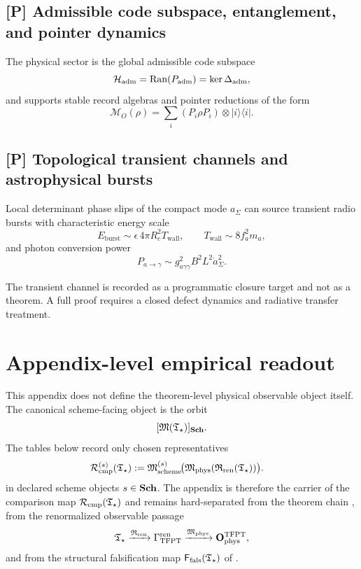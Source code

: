 \subsection{[P] Admissible code subspace, entanglement, and pointer dynamics}

\begin{conjecture}
\label{prop:global_admissible_code_subspace}
The physical sector is the global admissible code subspace
\[
\mathcal H_{\mathrm{adm}}=\operatorname{Ran}(P_{\mathrm{adm}})=\ker\Delta_{\mathrm{adm}},
\]
and supports stable record algebras and pointer reductions of the form
\[
\mathcal M_O(\rho)=\sum_i (P_i\rho P_i)\otimes |i\rangle\langle i|.
\]
\end{conjecture}

\subsection{[P] Topological transient channels and astrophysical bursts}

\begin{conjecture}
\label{conj:topological_phase_slip_burst_channel}
Local determinant phase slips of the compact mode \(a_\Sigma\) can source transient
radio bursts with characteristic energy scale
\[
E_{\mathrm{burst}}\sim \epsilon\,4\pi R_c^2T_{\mathrm{wall}},
\qquad
T_{\mathrm{wall}}\sim 8f_a^2m_a,
\]
and photon conversion power
\[
P_{a\to\gamma}\sim g_{a\gamma\gamma}^2B^2L^2\dot a_\Sigma^2.
\]
\end{conjecture}

\begin{remark}
The transient channel is recorded as a programmatic closure target and not as a theorem. A full
proof requires a closed defect dynamics and radiative transfer treatment.
\end{remark}


\section{Appendix-level empirical readout}
\label{sec:appendix-empirical-readout}
\label{app:comparison}

This appendix does not define the theorem-level physical observable object itself. The canonical
scheme-facing object is the orbit
\[
[\mathfrak M(\mathfrak T_{\star})]_{\mathbf{Sch}}.
\]
The tables below record only chosen representatives
\[
\begin{aligned}
\mathcal R_{\mathrm{cmp}}^{(s)}(\mathfrak T_{\star})
&:=
\mathfrak M_{\mathrm{scheme}}^{(s)}\!\bigl(\mathfrak M_{\mathrm{phys}}(\mathfrak R_{\mathrm{ren}}(\mathfrak T_{\star}))\bigr).
\end{aligned}
\]
in declared scheme objects $s\in\mathbf{Sch}$. The appendix is therefore the carrier of the comparison
map $\mathcal R_{\mathrm{cmp}}(\mathfrak T_{\star})$ and remains hard-separated from the theorem chain
, from the renormalized observable passage
\[
\mathfrak T_{\star}\xrightarrow{\mathfrak R_{\mathrm{ren}}}\Gamma_{\mathrm{TFPT}}^{\mathrm{ren}}\xrightarrow{\mathfrak M_{\mathrm{phys}}}\mathbf O_{\mathrm{phys}}^{\mathrm{TFPT}},
\]
and from the structural falsification map $\mathsf F_{\mathrm{fals}}(\mathfrak T_{\star})$ of
.

